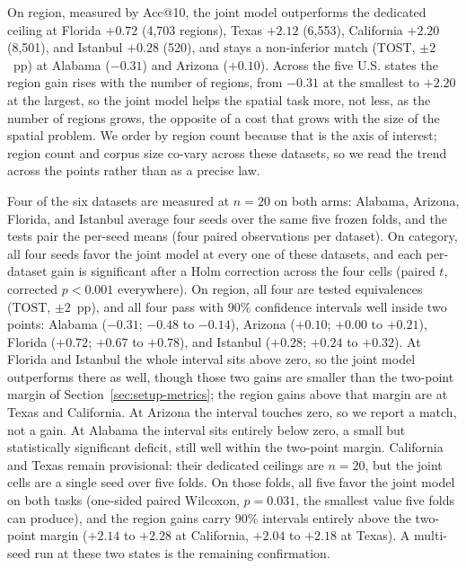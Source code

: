 On region, measured by Acc@10, the joint
model outperforms the dedicated ceiling at Florida $+0.72$ (4{,}703 regions),
Texas $+2.12$ (6{,}553), California $+2.20$ (8{,}501), and Istanbul $+0.28$
(520), and stays a non-inferior match (TOST, $\pm2$~pp) at Alabama ($-0.31$)
and Arizona ($+0.10$). Across the five U.S. states the region gain rises with
the number of regions, from $-0.31$ at the smallest to $+2.20$ at the largest,
so the joint model helps the spatial task more, not less, as the number of
regions grows, the opposite of a cost that grows with the size of the spatial
problem. We order by
region count because that is the axis of interest; region count and corpus size
co-vary across these datasets, so we read the trend across the points rather
than as a precise law.

Four of the six datasets are measured at $n{=}20$ on both arms: Alabama,
Arizona, Florida, and Istanbul average four seeds over the same five frozen
folds, and the tests pair the per-seed means (four paired observations per
dataset). On category, all four seeds favor
the joint model at every one of these datasets, and each per-dataset gain is
significant after a Holm correction across the four cells (paired $t$,
corrected $p<0.001$ everywhere). On region, all four are tested equivalences
(TOST, $\pm2$~pp), and all four pass with 90\% confidence intervals well inside
two points: Alabama ($-0.31$; $-0.48$ to $-0.14$), Arizona ($+0.10$; $+0.00$ to
$+0.21$), Florida ($+0.72$; $+0.67$ to $+0.78$), and Istanbul ($+0.28$; $+0.24$
to $+0.32$). At Florida and Istanbul the whole interval sits above zero, so the
joint model outperforms there as well, though those two gains are smaller than the
two-point margin of Section~\ref{sec:setup-metrics}; the region gains above
that margin are at Texas and California. At Arizona the interval touches zero, so
we report a match, not a gain. At Alabama the interval sits entirely below zero, a small but
statistically significant deficit, still well within the two-point margin. California and Texas remain provisional: their
dedicated ceilings are $n{=}20$, but the joint cells are a single seed over
five folds. On those folds, all five favor the joint model on both tasks
(one-sided paired Wilcoxon, $p{=}0.031$, the smallest value five folds
can produce), and the region
gains carry 90\% intervals entirely above the two-point margin ($+2.14$ to
$+2.28$ at California, $+2.04$ to $+2.18$ at Texas). A multi-seed run at these
two states is the remaining confirmation.

